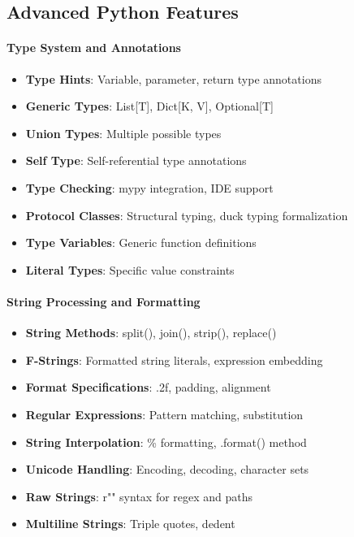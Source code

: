 \subsection{Advanced Python Features}

\paragraph{Type System and Annotations \starfull\starfull\starfull\starfull\starempty}
\begin{itemize}
\item[\checkmark] \textbf{Type Hints}: Variable, parameter, return type annotations
\item[\checkmark] \textbf{Generic Types}: List[T], Dict[K, V], Optional[T]
\item[\checkmark] \textbf{Union Types}: Multiple possible types
\item[\checkmark] \textbf{Self Type}: Self-referential type annotations
\item[\checkmark] \textbf{Type Checking}: mypy integration, IDE support
\item[\checkmark] \textbf{Protocol Classes}: Structural typing, duck typing formalization
\item[\checkmark] \textbf{Type Variables}: Generic function definitions
\item[\checkmark] \textbf{Literal Types}: Specific value constraints
\end{itemize}

\paragraph{String Processing and Formatting \starfull\starfull\starfull\starfull\starempty}
\begin{itemize}
\item[\checkmark] \textbf{String Methods}: split(), join(), strip(), replace()
\item[\checkmark] \textbf{F-Strings}: Formatted string literals, expression embedding
\item[\checkmark] \textbf{Format Specifications}: .2f, padding, alignment
\item[\checkmark] \textbf{Regular Expressions}: Pattern matching, substitution
\item[\checkmark] \textbf{String Interpolation}: \% formatting, .format() method
\item[\checkmark] \textbf{Unicode Handling}: Encoding, decoding, character sets
\item[\checkmark] \textbf{Raw Strings}: r"" syntax for regex and paths
\item[\checkmark] \textbf{Multiline Strings}: Triple quotes, dedent
\end{itemize}

